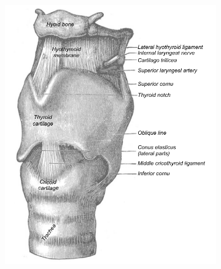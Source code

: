 \documentclass[12pt, letter]{report}
\begin{document}
\begin{figure}
\centering
\begin{subfigure}[b]{0.4\linewidth}
\centering
\includegraphics[width=\linewidth]{larynx_ligaments_antero_lateral.png}
\caption{}
\end{subfigure}
\begin{subfigure}[b]{0.4\linewidth}
\centering

\end{subfigure}
\end{figure}
\end{document}
